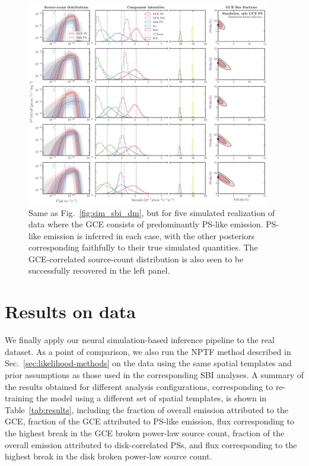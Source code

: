 \documentclass[prd,aps,10pt,nofootinbib,twocolumn,superscriptaddress,preprintnumbers,balancelastpage,longbibliography]{revtex4-1}
\begin{document}
%
\begin{figure}
\centering
\includegraphics[width=0.95\textwidth]{plots/sim_sbi_ps.pdf}
\caption{Same as Fig.~\ref{fig:sim_sbi_dm}, but for five simulated realization of \Fermi data where the GCE consists of predominantly PS-like emission. PS-like emission is inferred in each case, with the other posteriors corresponding faithfully to their true simulated quantities. The GCE-correlated source-count distribution is also seen to be successfully recovered in the left panel.}
\label{fig:sim_sbi_ps}
\end{figure}
%

\section{Results on \Fermi data}
\label{sec:data}

We finally apply our neural simulation-based inference pipeline to the real \Fermi dataset. As a point of comparison, we also run the NPTF method described in Sec.~\ref{sec:likelihood-methods} on the data using the same spatial templates and prior assumptions as those used in the corresponding SBI analyses. A summary of the results obtained for different analysis configurations, corresponding to re-training the model using a different set of spatial templates, is shown in Table~\ref{tab:results}, including the fraction of overall emission attributed to the GCE, fraction of the GCE attributed to PS-like emission, flux corresponding to the highest break in the GCE broken power-law source count, fraction of the overall emission attributed to disk-correlated PSs, and flux corresponding to the highest break in the disk broken power-law source count.
\end{document}

